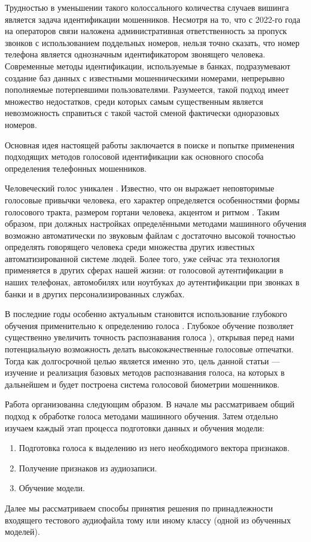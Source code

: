 \documentclass{gost-7-32}
\begin{document}
Трудностью в уменьшении такого колоссального \cite{korea_vishing} количества случаев вишинга является задача идентификации мошенников.
Несмотря на то, что с 2022-го года на операторов связи наложена административная ответственность за пропуск звонков с использованием поддельных номеров, нельзя точно сказать, что номер телефона является однозначным идентификатором звонящего человека.
Современные методы идентификации, используемые в банках, подразумевают создание баз данных с известными мошенническими номерами, непрерывно пополняемые потерпевшими пользователями.
Разумеется, такой подход имеет множество недостатков, среди которых самым существенным является невозможность справиться с такой частой сменой фактически одноразовых номеров.

Основная идея настоящей работы заключается в поиске и попытке применения подходящих методов голосовой идентификации как основного способа определения телефонных мошенников.

Человеческий голос уникален \cite{bai2021, irum_overview}.
Известно, что он выражает неповторимые голосовые привычки человека, его характер определяется особенностями формы голосового тракта, размером гортани человека, акцентом и ритмом \cite{kin2010}.
Таким образом, при должных настройках определёнными методами машинного обучения возможно автоматически по звуковым файлам с достаточно высокой точностью \cite{bai2021, irum_overview, lstm} определять говорящего человека среди множества других известных автоматизированной системе людей.
Более того, уже сейчас эта технология применяется в других сферах нашей жизни: от голосовой аутентификации в наших телефонах, автомобилях или ноутбуках до аутентификации при звонках в банки и в других персонализированных службах.

В последние годы особенно актуальным становится использование глубокого обучения применительно к определению голоса \cite{bai2021, irum_overview}.
Глубокое обучение позволяет существенно увеличить точность распознавания голоса \cite{deep2018, eshan_deep, deep_text_dep}), открывая перед нами потенциальную возможность делать высококачественные голосовые отпечатки.
Тогда как долгосрочной целью является именно это, цель данной статьи --- изучение и реализация базовых методов распознавания голоса, на которых в дальнейшем и будет построена система голосовой биометрии мошенников.

Работа организованна следующим образом.
В начале мы рассматриваем общий подход к обработке голоса методами машинного обучения.
Затем отдельно изучаем каждый этап процесса подготовки данных и обучения модели:
\begin{enumerate}
\setlength{\itemsep}{1pt}
\setlength{\parskip}{0pt}
\setlength{\parsep}{0pt}

    \item Подготовка голоса к выделению из него необходимого вектора признаков.
    \item Получение признаков из аудиозаписи.
    \item Обучение модели.
\end{enumerate}
Далее мы рассматриваем способы принятия решения по принадлежности входящего тестового аудиофайла тому или иному классу (одной из обученных моделей).
\end{document}
